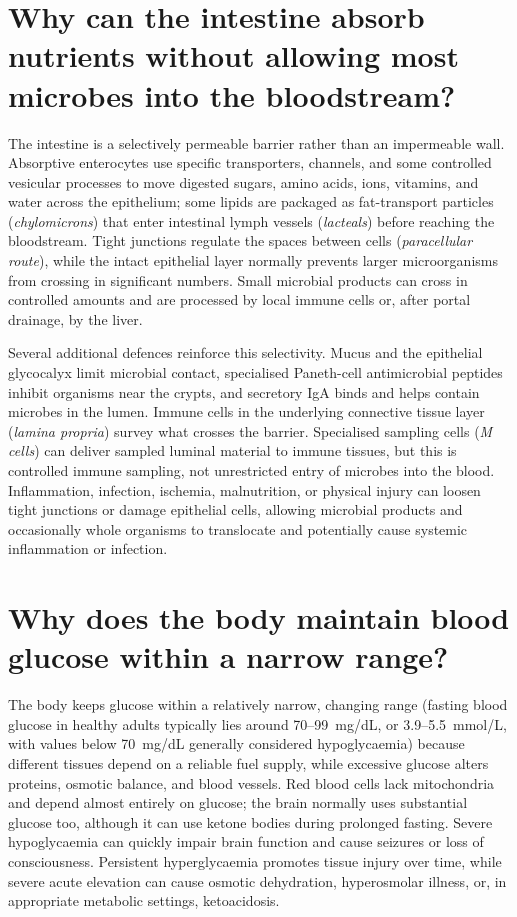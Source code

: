 \documentclass[11pt,oneside]{report}
\begin{document}
\section{Why can the intestine absorb nutrients without allowing most microbes into the bloodstream?}

The intestine is a selectively permeable barrier rather than an impermeable
wall. Absorptive enterocytes use specific transporters, channels, and some
controlled vesicular processes to move digested sugars, amino acids, ions,
vitamins, and water across the epithelium; some lipids are packaged as
fat-transport particles (\emph{chylomicrons}) that enter intestinal lymph vessels
(\emph{lacteals}) before reaching the bloodstream. Tight junctions regulate the
spaces between cells (\emph{paracellular route}), while the intact epithelial
layer normally prevents larger microorganisms from crossing in significant
numbers. Small microbial products can cross in controlled amounts
and are processed by local immune cells or, after portal drainage, by the liver.

Several additional defences reinforce this selectivity. Mucus and the
epithelial glycocalyx limit microbial contact, specialised Paneth-cell
antimicrobial peptides inhibit organisms near the crypts, and secretory IgA
binds and helps contain microbes in the lumen. Immune cells in the underlying
connective tissue layer (\emph{lamina propria}) survey what crosses the barrier.
Specialised sampling cells (\emph{M cells}) can deliver sampled luminal
material to immune tissues, but this is controlled immune sampling, not
unrestricted entry of microbes into the blood. Inflammation, infection,
ischemia, malnutrition, or physical injury can loosen tight junctions or damage
epithelial cells, allowing microbial products and occasionally whole organisms
to translocate and potentially cause systemic inflammation or infection.

\section{Why does the body maintain blood glucose within a narrow range?}

The body keeps glucose within a relatively narrow, changing range (fasting
blood glucose in healthy adults typically lies around 70--99~mg/dL, or
3.9--5.5~mmol/L, with values below 70~mg/dL generally considered hypoglycaemia)
because different tissues depend on a reliable fuel supply, while excessive
glucose alters proteins, osmotic balance, and blood vessels. Red blood cells lack
mitochondria and depend almost entirely on glucose; the brain normally uses
substantial glucose too, although it can use ketone bodies during prolonged
fasting. Severe hypoglycaemia can quickly impair brain function and cause
seizures or loss of consciousness. Persistent hyperglycaemia promotes tissue
injury over time, while severe acute elevation can cause osmotic dehydration,
hyperosmolar illness, or, in appropriate metabolic settings, ketoacidosis.
\end{document}
